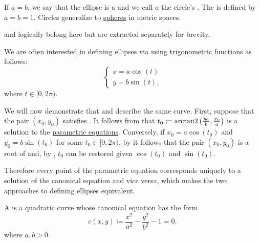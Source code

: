\begin{definition}
\begin{DefEnum}
    If \( a = b \), we say that the ellipse is a  and we call \( a \) the circle's . The  is defined by \( a = b = 1 \). Circles generalize to \hyperref[def:metric_space/sphere]{spheres} in metric spaces.

     and  logically belong here but are extracted separately for brevity.

    We are often interested in defining ellipses via  using \hyperref[def:trigonometric_functions]{trigonometric functions} as follows:
    \begin{equation}\label{def:quadratic_plane_curve/ellipse/parametric_equations}
      \begin{cases}
        x = a \cos(t) \\
        y = b \sin(t),
      \end{cases}
    \end{equation}
    where \( t \in [0, 2\pi) \).

    We will now demonstrate that  and  describe the same curve. First, suppose that the pair \( (x_0, y_0) \) satisfies . It follows from  that \( t_0 \coloneqq \operatorname{arctan2}\left(\tfrac {y_0} b, \tfrac {x_0} a \right) \) is a solution to the \hyperref[def:quadratic_plane_curve/ellipse/parametric_equations]{parametric equations}. Conversely, if \( x_0 = a \cos(t_0) \) and \( y_0 = b \sin(t_0) \) for some \( t_0 \in [0, 2\pi) \), by  it follows that the pair \( (x_0, y_0) \) is a root of  and, by , \( t_0 \) can be restored given \( \cos(t_0) \) and \( \sin(t_0) \).

    Therefore every point of the parametric equation  corresponds uniquely to a solution of the canonical equation  and vice versa, which makes the two approaches to defining ellipses equivalent.

     A  is a quadratic curve whose canonical equation has the form
    \begin{equation}\label{def:quadratic_plane_curve/hyperbola/canonical_equation}
      c(x, y) \coloneqq \frac {x^2} {a^2} - \frac {y^2} {b^2} - 1 = 0,
    \end{equation}
    where \( a, b > 0 \).


\end{DefEnum}
\end{definition}
